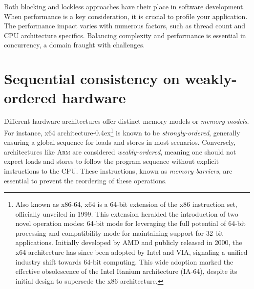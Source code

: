 \documentclass[fontsize=10pt, oneside]{scrartcl}
\newcommand{\punckern}{\kern-0.4ex}
\newcommand{\introduce}[1]{\textit{#1}}
\begin{document}
Both blocking and lockless approaches have their place in software development.
When performance is a key consideration, it is crucial to profile your application.
The performance impact varies with numerous factors, such as thread count and \textsc{CPU} architecture specifics.
Balancing complexity and performance is essential in concurrency, a domain fraught with challenges.

\section{Sequential consistency on weakly-ordered hardware}

Different hardware architectures offer distinct memory models or \introduce{memory models}.
For instance, x64 architecture\punckern\footnote{%
Also known as x86-64, x64 is a 64-bit extension of the x86 instruction set, officially unveiled in 1999.
This extension heralded the introduction of two novel operation modes:
64-bit mode for leveraging the full potential of 64-bit processing and compatibility mode for maintaining support for 32-bit applications.
Initially developed by AMD and publicly released in 2000, the x64 architecture has since been adopted by Intel and VIA,
signaling a unified industry shift towards 64-bit computing.
This wide adoption marked the effective obsolescence of the Intel Itanium architecture (IA-64),
despite its initial design to supersede the x86 architecture.
} is known to be \introduce{strongly-ordered},
generally ensuring a global sequence for loads and stores in most scenarios.
Conversely, architectures like \textsc{Arm} are considered \introduce{weakly-ordered},
meaning one should not expect loads and stores to follow the program sequence without explicit instructions to the \textsc{CPU}.
These instructions, known as \introduce{memory barriers}, are essential to prevent the reordering of these operations.
\end{document}
